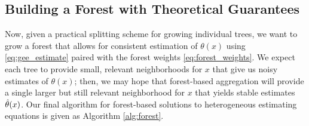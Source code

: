 \documentclass[aos]{imsart}
\theoremstyle{plain}
\theoremstyle{definition}
\theoremstyle{remark}
\begin{document}
\begin{CJK}{UTF8}{gbsn}
\subsection{Building a Forest with Theoretical Guarantees}
\label{sec:implementation}

Now, given a practical splitting scheme for growing individual trees, we want to grow a forest that allows for consistent estimation of $\theta(x)$ using \eqref{eq:gee_estimate} paired with the forest weights \eqref{eq:forest_weights}. We expect each
tree to provide small, relevant neighborhoods for $x$ that give us noisy estimates of $\theta(x)$; then, we may hope that forest-based aggregation will provide a single larger but still relevant neighborhood for $x$ that yields stable estimates $\hat{\theta}(x)$. Our final algorithm for forest-based solutions to heterogeneous estimating equations is given as Algorithm \ref{alg:forest}.



\newcommand{\pluseq}{\mathrel{+}=}


\end{CJK}
\end{document}
